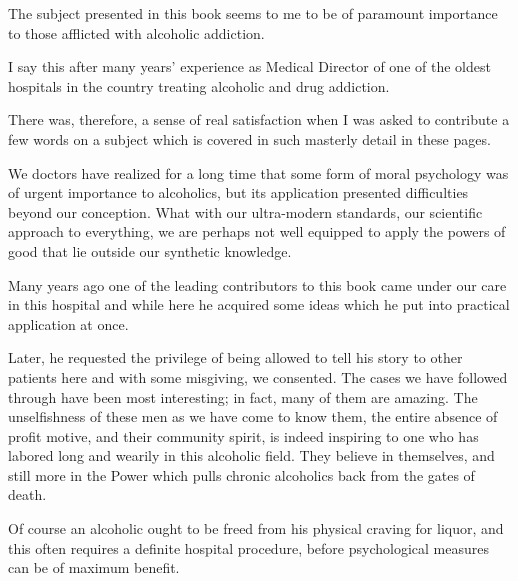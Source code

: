 \begin{biblechapter}
    The subject presented in this book seems to me 
    to be of paramount importance to those afflicted 
    with alcoholic addiction.

\verse I say this after many years' experience as Medical Director 
    of one of the oldest hospitals in the country 
    treating alcoholic and drug addiction.

\verse There was, therefore, a sense of real satisfaction 
    when I was asked to contribute a few words on a subject 
    which is covered in such masterly detail in these pages.

    We doctors have realized for a long time 
    that some form of moral psychology 
    was of urgent importance to alcoholics, 
    but its application presented difficulties beyond our conception. 
\verse What with our ultra-modern standards, 
    our scientific approach to everything, 
    we are perhaps not well equipped to apply the powers of good 
    that lie outside our synthetic knowledge.

\verse Many years ago one of the leading contributors to this book 
    came under our care in this hospital and while here 
    he acquired some ideas which he put into practical application at once.

    Later, he requested the privilege 
    of being allowed to tell his story to other patients here 
    and with some misgiving, we consented. 
\verse The cases we have followed through have been most interesting; 
    in fact, many of them are amazing.
\verse The unselfishness of these men as we have come to know them, 
    the entire absence of profit motive, 
    and their community spirit, 
    is indeed inspiring to one who has labored long and wearily 
    in this alcoholic field. 
\verse They believe in themselves, 
    and still more in the Power which 
    pulls chronic alcoholics back from the gates of death.

    Of course an alcoholic ought to be freed 
    from his physical craving for liquor, 
    and this often requires a definite hospital procedure, 
    before psychological measures can be of maximum benefit.
\end{biblechapter}


